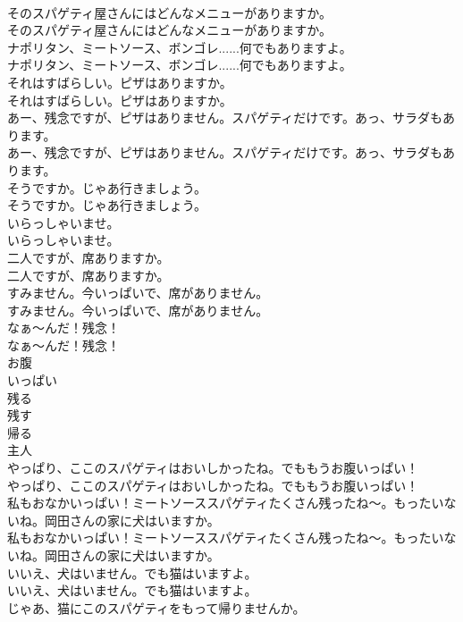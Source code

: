 \documentclass[8pt]{extreport}
\begin{document}
\begin{CJK}{UTF8}{min}
\\	そのスパゲティ屋さんにはどんなメニューがありますか。	
\\	そのスパゲティ屋さんにはどんなメニューがありますか。 
\\	ナポリタン、ミートソース、ボンゴレ......何でもありますよ。	
\\	ナポリタン、ミートソース、ボンゴレ......何でもありますよ。 
\\	それはすばらしい。ピザはありますか。	
\\	それはすばらしい。ピザはありますか。 
\\	あー、残念ですが、ピザはありません。スパゲティだけです。あっ、サラダもあります。	
\\	あー、残念ですが、ピザはありません。スパゲティだけです。あっ、サラダもあります。 
\\	そうですか。じゃあ行きましょう。	
\\	そうですか。じゃあ行きましょう。 
\\	いらっしゃいませ。	
\\	いらっしゃいませ。 
\\	二人ですが、席ありますか。	
\\	二人ですが、席ありますか。 
\\	すみません。今いっぱいで、席がありません。	
\\	すみません。今いっぱいで、席がありません。 
\\	なぁ〜んだ！残念！	
\\	なぁ〜んだ！残念！ 
\\	お腹
\\	いっぱい
\\	残る
\\	残す
\\	帰る
\\	主人
\\	やっぱり、ここのスパゲティはおいしかったね。でももうお腹いっぱい！	
\\	やっぱり、ここのスパゲティはおいしかったね。でももうお腹いっぱい！ 
\\	私もおなかいっぱい！ミートソーススパゲティたくさん残ったね〜。もったいないね。岡田さんの家に犬はいますか。	
\\	私もおなかいっぱい！ミートソーススパゲティたくさん残ったね〜。もったいないね。岡田さんの家に犬はいますか。 
\\	いいえ、犬はいません。でも猫はいますよ。	
\\	いいえ、犬はいません。でも猫はいますよ。 
\\	じゃあ、猫にこのスパゲティをもって帰りませんか。	

\end{CJK}
\end{document}
